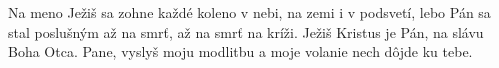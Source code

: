 Na meno Ježiš sa zohne každé koleno
v nebi, na zemi i v podsvetí,
lebo Pán sa stal poslušným až na smrť,
až na smrť na kríži.
Ježiš Kristus je Pán,
na slávu Boha Otca.
\versseparator
Pane, vyslyš moju modlitbu
a moje volanie nech dôjde ku tebe.
